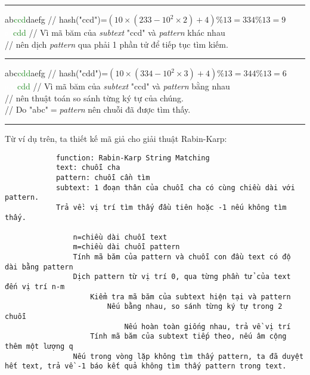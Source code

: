 \documentclass[a4paper,11pt]{article}
\begin{document}
			\vspace*{2mm}
			\hrule
			ab\textcolor{ForestGreen}{ccd}daefg \hspace*{0.6cm} // hash("ccd")=$(10\times(233-10^2\times2)+4)\%13=334\%13=9$\\
			\textcolor{white}{aa}\textcolor{ForestGreen}{cdd} \hspace*{1.4cm} // Vì mã băm của \textit{subtext} "ccd" và \textit{pattern} khác nhau \\
		\hspace*{2.5cm} // nên dịch \textit{pattern} qua phải 1 phần tử để tiếp tục tìm kiếm.

			\vspace*{2mm}
			\hrule
			abc\textcolor{ForestGreen}{cdd}aefg \hspace*{0.6cm} // hash("cdd")=$(10\times(334-10^2\times3)+4)\%13=344\%13=6$\\
			\textcolor{white}{aaa}\textcolor{ForestGreen}{cdd} \hspace*{1.2cm} // Vì mã băm của \textit{subtext} "ccd" và \textit{pattern} bằng nhau \\
		\hspace*{2.5cm} // nên thuật toán so sánh từng ký tự của chúng.\\
		\hspace*{2.5cm} // Do "abc"$=$\textit{pattern} nên chuỗi đã được tìm thấy.

		\vspace*{2mm}
		\hrule
		\vspace*{4mm}
		Từ ví dụ trên, ta thiết kế mã giả cho giải thuật Rabin-Karp:

			\begin{lstlisting}
			function: Rabin-Karp String Matching
			text: chuỗi cha 
			pattern: chuỗi cần tìm 
			subtext: 1 đoạn thân của chuỗi cha có cùng chiều dài với pattern.
			Trả về: vị trí tìm thấy đầu tiên hoặc -1 nếu không tìm thấy.
			
				n=chiều dài chuỗi text
				m=chiều dài chuỗi pattern
				Tính mã băm của pattern và chuỗi con đầu text có độ dài bằng pattern
				Dịch pattern từ vị trí 0, qua từng phần tử của text đến vị trí n-m
					Kiểm tra mã băm của subtext hiện tại và pattern
						Nếu bằng nhau, so sánh từng ký tự trong 2 chuỗi
							Nếu hoàn toàn giống nhau, trả về vị trí
					Tính mã băm của subtext tiếp theo, nếu âm cộng thêm một lượng q
				Nếu trong vòng lặp không tìm thấy pattern, ta đã duyệt hết text, trả về -1 báo kết quả không tìm thấy pattern trong text.
			\end{lstlisting}
\end{document}
